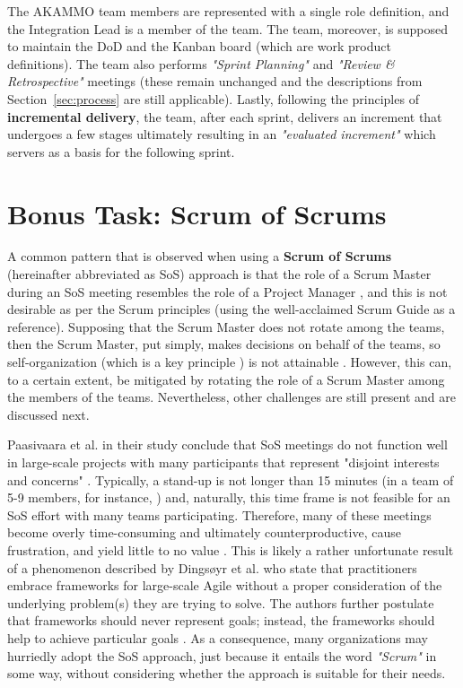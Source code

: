 \documentclass[conference]{IEEEtran}
\begin{document}
The \selectfont AKAMMO\rmfamily{} team members are represented
with a single role definition, and the Integration Lead is a member of the team. The
team, moreover, is supposed to maintain the DoD and the Kanban board (which are
work product definitions). The team also performs \textit{"Sprint Planning"} and
\textit{"Review \& Retrospective"} meetings (these remain unchanged and the
descriptions from Section~\ref{sec:process} are still applicable). Lastly,
following the principles of \textbf{incremental delivery}, the team, after each
sprint, delivers an increment that undergoes a few stages ultimately resulting
in an \textit{"evaluated increment"} which servers as a basis for the following
sprint.

\section{Bonus Task: Scrum of Scrums}
\label{sec:bonus_task}

A common pattern that is observed when using a \textbf{Scrum of Scrums}
(hereinafter abbreviated as SoS) approach is that the role of a Scrum Master
during an SoS meeting resembles the role of a Project Manager
\cite{Larman2010}, and this is not desirable as per the Scrum principles (using
the well-acclaimed Scrum Guide \cite{Schwaber2020} as a reference). Supposing
that the Scrum Master does not rotate among the teams, then the Scrum Master,
put simply, makes decisions on behalf of the teams, so self-organization (which
is a key principle \cite{Dikert2016}) is not attainable \cite{Larman2010}.
However, this can, to a certain extent, be mitigated by rotating the role of a
Scrum Master among the members of the teams. Nevertheless, other challenges are
still present and are discussed next.

Paasivaara et al. in their study conclude that SoS meetings do not function
well in large-scale projects with many participants that represent "disjoint
interests and concerns" \cite{Paasivaara2012}. Typically, a stand-up is not
longer than 15 minutes (in a team of 5-9 members, for instance,
\cite{Schwaber2020}) and, naturally, this time frame is not feasible for an SoS
effort with many teams participating. Therefore, many of these meetings become
overly time-consuming and ultimately counterproductive, cause frustration, and
yield little to no value \cite{Paasivaara2012}. This is likely a rather
unfortunate result of a phenomenon described by Dings\o{}yr et al.
\cite{Dingsoyr2019} who state that practitioners embrace frameworks for
large-scale Agile without a proper consideration of the underlying problem(s)
they are trying to solve. The authors further postulate that frameworks should
never represent goals; instead, the frameworks should help to achieve
particular goals \cite{Dingsoyr2019}. As a consequence, many organizations may
hurriedly adopt the SoS approach, just because it entails the word
\textit{"Scrum"} in some way, without considering whether the approach is
suitable for their needs.
\end{document}
